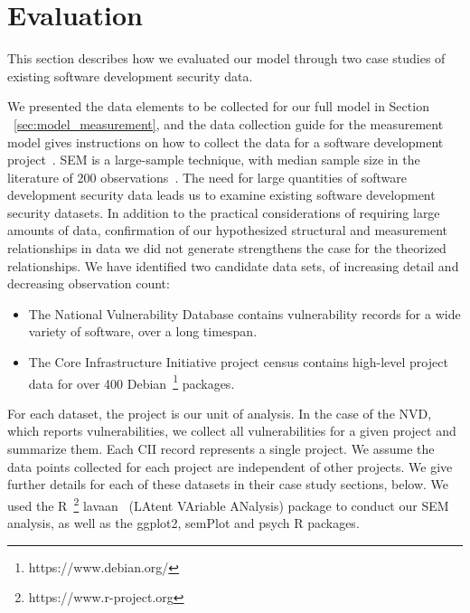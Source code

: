 \section{Evaluation}
\label{sec:evaluation}
This section describes how we evaluated our model through two case studies of existing software development security data.

We presented the data elements to be collected for our full model in Section ~\ref{sec:model_measurement}, and the data collection guide for the measurement model gives instructions on how to collect the data for a software development project~\cite{morrison2016spefsite}.  SEM is a large-sample technique, with median sample size in the literature of 200 observations~\cite{kline2015principles}. The need for large quantities of software development security data leads us to examine existing software development security datasets. In addition to the practical considerations of requiring large amounts of data, confirmation of our hypothesized structural and measurement relationships in data we did not generate strengthens the case for the theorized relationships.
We have identified two candidate data sets, of increasing detail and decreasing observation count: 
\begin{itemize}
\item The National Vulnerability Database contains vulnerability records for a wide variety of software, over a long timespan.
\item The Core Infrastructure Initiative project census contains high-level project data for over 400 Debian~\footnote{https://www.debian.org/} packages.
\end{itemize}

For each dataset, the project is our unit of analysis. In the case of the NVD, which reports vulnerabilities, we collect all vulnerabilities for a given project and summarize them. Each CII record represents a single project. We assume the data points collected for each project are independent of other projects.  We give further details for each of these datasets in their case study sections, below. We used the R~\footnote{https://www.r-project.org}  lavaan~\cite{roseel2012lavaan} (LAtent VAriable ANalysis) package to conduct our SEM analysis, as well as the ggplot2, semPlot and psych R packages.